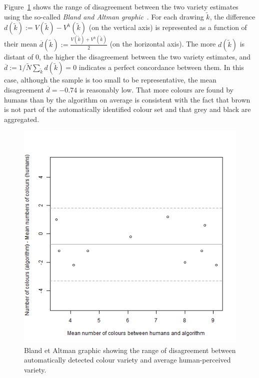 \documentclass[11pt,a4paper]{article}
\begin{document}
Figure~\ref{fig:blandandaltman} shows the range of disagreement between the two variety estimates using the so-called \textit{Bland and Altman graphic}~\cite{bland1986}. For each drawing $\tilde{k}$, the difference $d(\tilde{k}) := V(\tilde{k}) - V^h(\tilde{k})$ (on the vertical axis) is represented as a function of their mean $\overline{d}(\tilde{k}) := \frac{V(\tilde{k}) + V^h(\tilde{k})}{2}$ (on the horizontal axis). The more $d(\tilde{k})$ is distant of  $0$, the higher the disagreement between the two variety estimates, and $\overline{d} := 1/\tilde{N}\sum_{\tilde{k}}d(\tilde{k}) = 0$ indicates a perfect concordance between them. 
In this case, although the sample is too small to be representative, the mean disagreement $\overline{d}=-0.74$ is reasonably low. That more colours are found by humans than by the algorithm on average is consistent with the fact that brown is not part of the automatically identified colour set and that grey and black are aggregated.

\begin{figure}[h!]
	\centering
	\includegraphics[width=\linewidth]{figures/comp_nb_colours_agreement.png}
	\caption{Bland et Altman graphic showing the range of disagreement between automatically detected colour variety and average human-perceived variety.}
	\label{fig:blandandaltman}
\end{figure}
\end{document}
